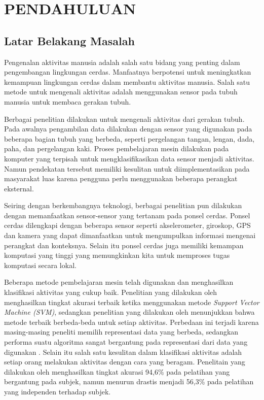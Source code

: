 \chapter{PENDAHULUAN}

\section{Latar Belakang Masalah}
Pengenalan aktivitas manusia adalah salah satu bidang yang penting dalam pengembangan lingkungan cerdas. Manfaatnya berpotensi untuk meningkatkan kemampuan lingkungan cerdas dalam membantu aktivitas manusia. Salah satu metode untuk mengenali aktivitas adalah menggunakan sensor pada tubuh manusia untuk membaca gerakan tubuh.

Berbagai penelitian dilakukan untuk mengenali aktivitas dari gerakan tubuh. Pada awalnya pengambilan data dilakukan dengan sensor yang digunakan pada beberapa bagian tubuh yang berbeda, seperti pergelangan tangan, lengan, dada, paha, dan pergelangan kaki. Proses pembelajaran mesin dilakukan pada komputer yang terpisah untuk mengklasifikasikan data sensor menjadi aktivitas. Namun pendekatan tersebut memiliki kesulitan untuk diimplementasikan pada masyarakat luas karena pengguna perlu menggunakan beberapa perangkat eksternal.

Seiring dengan berkembangnya teknologi, berbagai penelitian pun dilakukan dengan memanfaatkan sensor-sensor yang tertanam pada ponsel cerdas. Ponsel cerdas dilengkapi dengan beberapa sensor seperti akselerometer, giroskop, GPS dan kamera yang dapat dimanfaatkan untuk mengumpulkan informasi mengenai perangkat dan konteksnya. Selain itu ponsel cerdas juga memiliki kemampan komputasi yang tinggi yang memungkinkan kita untuk memproses tugas komputasi secara lokal.

Beberapa metode pembelajaran mesin telah digunakan dan menghasilkan klasifikasi aktivitas yang cukup baik. Penelitian yang dilakukan oleh \citet{Chiang-201413} menghasilkan tingkat akurasi terbaik ketika menggunakan metode \textit{Support Vector Machine (SVM)}, sedangkan penelitian yang dilakukan oleh \citet{shoaib-2013} menunjukkan bahwa metode terbaik berbeda-beda untuk setiap aktivitas. Perbedaan ini terjadi karena masing-masing peneliti memilih representasi data yang berbeda, sedangkan performa suatu algoritma sangat bergantung pada representasi dari data yang digunakan \citep{Goodfellow-2016}. Selain itu salah satu kesulitan dalam klasifikasi aktivitas adalah setiap orang melakukan aktivitas dengan cara yang beragam. Penelitain yang dilakukan oleh \citet{tapia-2007} menghasilkan tingkat akurasi 94,6\% pada pelatihan yang bergantung pada subjek, namun menurun drastis menjadi 56,3\% pada pelatihan yang independen terhadap subjek.

